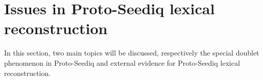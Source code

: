\documentclass[12pt]{article}
\newcommand{\psedf}{Proto-Seediq\xspace}
\newcommand{\stgf}{Tgdaya\xspace}
\newcommand{\stof}{Toda\xspace}
\newcommand{\sctrf}{Central Truku\xspace}
\newcommand{\setrf}{Eastern Truku\xspace}
\begin{document}
\section{Issues in Proto-Seediq lexical reconstruction}

In this section, two main topics will be discussed, respectively the special doublet phenomenon in \psedf and external evidence for \psedf lexical reconstruction. 

\begin{comment}
\subsection{Personal pronoun system in Proto-Seediq}

The personal pronoun system of \psedf is shown in Table \ref{tab:psedpron}. Just like many of Austronesian languages, Seediq distinguishes the differences of first person plural inclusive and exclusive. 

For the clitic (bound) forms, there are two sets of pronouns, some of the forms are the same between two cases. The oblique free forms are fully preserved in \stof, \sctrf, and \setrf. However in the \stgf dialect, there are only few remained, including \textit{kənan} `\textsc{1sg.obl}', \textit{sunan} `\textsc{2sg.obl}', and \textit{munan} `\textsc{1sg.obl}'. Note that \psedf *munan is for second person plural, but \textit{munan} in \stgf is for first person singular according to \textcite[62]{Sung2018Sedgrammar}. These oblique forms in \stgf are not usually used in daily speeches. The set of original nominative free form replace their function; the original nominative forms thus became neutral in \stgf (i.e. Nominative and oblique cases share the same forms).

\begin{table}[!htbp]
\centering
\caption{\psedf personal pronouns}
\label{tab:psedpron}
\begin{tabular}{lllll}
\hline
         & \multicolumn{2}{c}{Clitic} & \multicolumn{2}{c}{Free} \\ \hline
         & Nominative    & Genitive   & Nominative & Oblique     \\ \hline
\textsc{1sg}      & *=ku          & *=mu       & *yaku      & *kənan      \\
\textsc{2sg}      & *=su          & *=su       & *isu       & *sunan      \\
\textsc{3sg}      & ∅             & *=na; *=niya & *hiya      & *həyaan     \\
\textsc{1pl.incl} & *=ta          & *=ta       & *ita       & *tənan      \\
\textsc{1pl.excl} & *=nami        & *=nami     & *yami      & *mənan      \\
\textsc{2pl}      & *=namu        & *=namu     & *yamu      & *munan      \\
\textsc{3pl}      & ∅             & *=dəha     & *dəhəya    & *dəhəyaan   \\ \hline
\end{tabular}
\end{table}


\end{comment}
\end{document}
